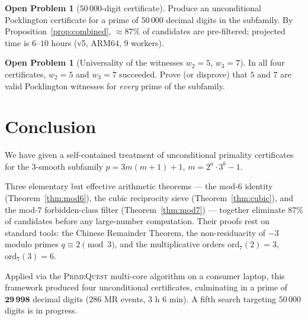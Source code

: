 \documentclass[11pt,a4paper]{article}
\theoremstyle{definition}
\newtheorem{problem}[theorem]{Open Problem}
\theoremstyle{remark}
\begin{document}
\begin{openprobbox}
\begin{problem}[$50\,000$-digit certificate]\label{op:50k}
Produce an unconditional Pocklington certificate for a prime of
$50\,000$ decimal digits in the subfamily. By Proposition~\ref{prop:combined},
$\approx 87\%$ of candidates are pre-filtered; projected time is
$6$--$10$ hours (v5, ARM64, 9 workers).
\end{problem}
\end{openprobbox}

\begin{openprobbox}
\begin{problem}[Universality of the witnesses $w_2=5$, $w_3=7$]
\label{op:witnesses}
In all four certificates, $w_2=5$ and $w_3=7$ succeeded. Prove (or
disprove) that $5$ and $7$ are valid Pocklington witnesses for
\emph{every} prime of the subfamily.
\end{problem}
\end{openprobbox}

\section{Conclusion}\label{sec:conclusion}

We have given a self-contained treatment of unconditional primality
certificates for the 3-smooth subfamily $p=3m(m+1)+1$, $m=2^a\cdot 3^b-1$.

Three elementary but effective arithmetic theorems — the mod-$6$ identity
(Theorem~\ref{thm:mod6}), the cubic reciprocity sieve
(Theorem~\ref{thm:cubic}), and the mod-$7$ forbidden-class filter
(Theorem~\ref{thm:mod7}) — together eliminate $87\%$ of candidates
before any large-number computation. Their proofs rest on standard tools:
the Chinese Remainder Theorem, the non-residuacity of $-3$ modulo primes
$q\equiv 2\pmod{3}$, and the multiplicative orders $\mathrm{ord}_7(2)=3$,
$\mathrm{ord}_7(3)=6$.

Applied via the \textsc{PrimeQuest} multi-core algorithm on a consumer
laptop, this framework produced four unconditional certificates, culminating
in a prime of $\mathbf{29\,998}$ decimal digits ($286$ MR events,
$3$ h $6$ min). A fifth search targeting $50\,000$ digits is in progress.

\end{document}
